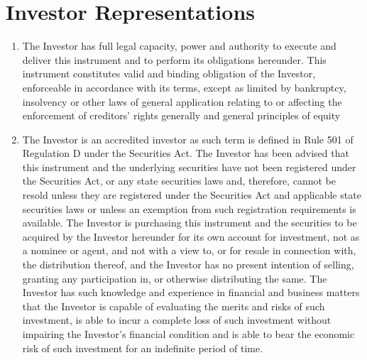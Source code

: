 \section{Investor Representations}
\label{sec:investorrepresentation}

\begin{enumerate}[label=(\alph*)]

\item {\begin{sloppypar}The Investor has full legal capacity, power and authority to
    execute and deliver this instrument and to perform its obligations
    hereunder. This instrument constitutes valid and binding
    obligation of the Investor, enforceable in accordance with its
    terms, except as limited by bankruptcy, insolvency or other laws
    of general application relating to or affecting the enforcement of
    creditors’ rights generally and general principles of equity\end{sloppypar}}

\item {The Investor is an accredited investor as such term is defined
    in Rule 501 of Regulation D under the Securities Act. The Investor
    has been advised that this instrument and the underlying
    securities have not been registered under the Securities Act, or
    any state securities laws and, therefore, cannot be resold unless
    they are registered under the Securities Act and applicable state
    securities laws or unless an exemption from such registration
    requirements is available. The Investor is purchasing this
    instrument and the securities to be acquired by the Investor
    hereunder for its own account for investment, not as a nominee or
    agent, and not with a view to, or for resale in connection with,
    the distribution thereof, and the Investor has no present
    intention of selling, granting any participation in, or otherwise
    distributing the same. The Investor has such knowledge and
    experience in financial and business matters that the Investor is
    capable of evaluating the merits and risks of such investment, is
    able to incur a complete loss of such investment without impairing
    the Investor’s financial condition and is able to bear the
    economic risk of such investment for an indefinite period of
    time.}

\end{enumerate}
